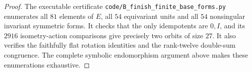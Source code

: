 \begin{proof}
The executable certificate
\texttt{code/B\_finish\_finite\_base\_forms.py} enumerates all
$81$ elements of $E$, all $54$ equivariant units and all $54$
nonsingular invariant symmetric forms. It checks that the only
idempotents are $0,I$, and its $2916$ isometry-action comparisons
give precisely two orbits of size $27$. It also verifies the
faithfully flat rotation identities and the rank-twelve
double-sum congruence. The complete symbolic endomorphism
argument above makes these enumerations exhaustive.
\end{proof}
